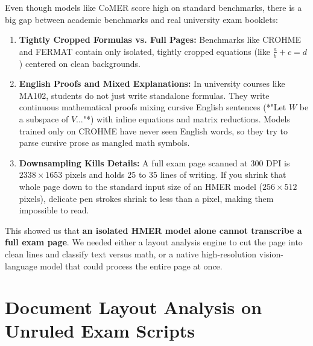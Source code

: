 Even though models like CoMER score high on standard benchmarks, there is a big gap between academic benchmarks and real university exam booklets:
\begin{enumerate}
    \item \textbf{Tightly Cropped Formulas vs. Full Pages:} Benchmarks like CROHME \cite{mouchere2016icfhr, mahdavi2019crohme} and FERMAT \cite{soni2024fermat} contain only isolated, tightly cropped equations (like $\frac{a}{b} + c = d$) centered on clean backgrounds.
    \item \textbf{English Proofs and Mixed Explanations:} In university courses like MA102, students do not just write standalone formulas. They write continuous mathematical proofs mixing cursive English sentences (*"Let $W$ be a subspace of $V$..."*) with inline equations and matrix reductions. Models trained only on CROHME have never seen English words, so they try to parse cursive prose as mangled math symbols.
    \item \textbf{Downsampling Kills Details:} A full exam page scanned at 300 DPI is $2338 \times 1653$ pixels and holds 25 to 35 lines of writing. If you shrink that whole page down to the standard input size of an HMER model ($256 \times 512$ pixels), delicate pen strokes shrink to less than a pixel, making them impossible to read.
\end{enumerate}

This showed us that \textbf{an isolated HMER model alone cannot transcribe a full exam page}. We needed either a layout analysis engine to cut the page into clean lines and classify text versus math, or a native high-resolution vision-language model that could process the entire page at once.

\section{Document Layout Analysis on Unruled Exam Scripts}
\label{sec:layout_analysis}

